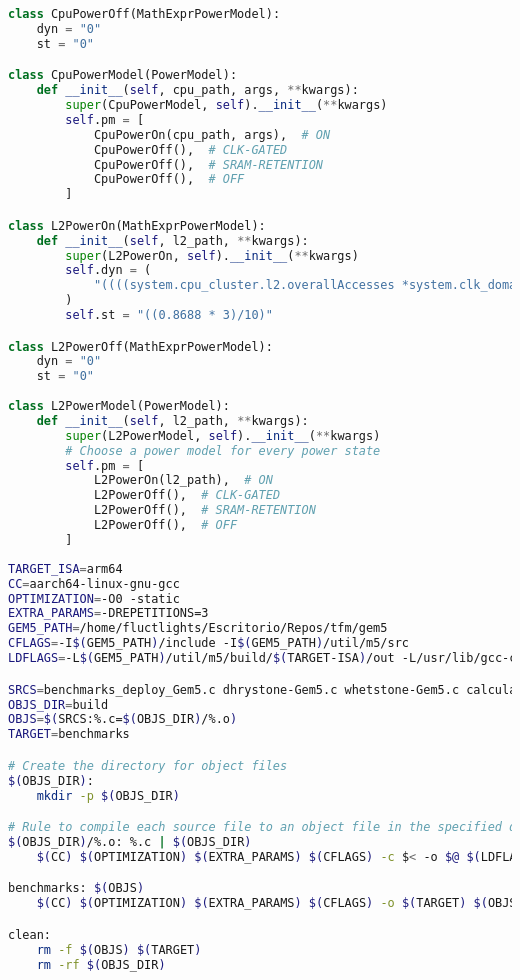 \begin{lstlisting}[language=Python,caption={Integración de modelado de energía en Gem5},label=lst:addPower,showstringspaces=false,frame=single]
class CpuPowerOff(MathExprPowerModel):
    dyn = "0"
    st = "0"

class CpuPowerModel(PowerModel):
    def __init__(self, cpu_path, args, **kwargs):
        super(CpuPowerModel, self).__init__(**kwargs)
        self.pm = [
            CpuPowerOn(cpu_path, args),  # ON
            CpuPowerOff(),  # CLK-GATED
            CpuPowerOff(),  # SRAM-RETENTION
            CpuPowerOff(),  # OFF
        ]

class L2PowerOn(MathExprPowerModel):
    def __init__(self, l2_path, **kwargs):
        super(L2PowerOn, self).__init__(**kwargs)
        self.dyn = (
            "((((system.cpu_cluster.l2.overallAccesses *system.clk_domain.clock)/(simSeconds*1e18)) * 1501.5 * (0.8688*0.8688) * 0.00000000572830963981) * 1e12)"
        )
        self.st = "((0.8688 * 3)/10)"

class L2PowerOff(MathExprPowerModel):
    dyn = "0"
    st = "0"
    
class L2PowerModel(PowerModel):
    def __init__(self, l2_path, **kwargs):
        super(L2PowerModel, self).__init__(**kwargs)
        # Choose a power model for every power state
        self.pm = [
            L2PowerOn(l2_path),  # ON
            L2PowerOff(),  # CLK-GATED
            L2PowerOff(),  # SRAM-RETENTION
            L2PowerOff(),  # OFF
        ]
\end{lstlisting}

\begin{lstlisting}[language=bash,caption={Makefile para automatizar compilaciones aarch64},label=lst:makefileCompilacionCruzada, showstringspaces=false,frame=single]
TARGET_ISA=arm64
CC=aarch64-linux-gnu-gcc
OPTIMIZATION=-O0 -static
EXTRA_PARAMS=-DREPETITIONS=3
GEM5_PATH=/home/fluctlights/Escritorio/Repos/tfm/gem5
CFLAGS=-I$(GEM5_PATH)/include -I$(GEM5_PATH)/util/m5/src
LDFLAGS=-L$(GEM5_PATH)/util/m5/build/$(TARGET-ISA)/out -L/usr/lib/gcc-cross/aarch64-linux-gnu/11 -lm5 -lm

SRCS=benchmarks_deploy_Gem5.c dhrystone-Gem5.c whetstone-Gem5.c calcular-pi-Gem5.c calcular-primos-Gem5.c
OBJS_DIR=build
OBJS=$(SRCS:%.c=$(OBJS_DIR)/%.o)
TARGET=benchmarks

# Create the directory for object files
$(OBJS_DIR):
    mkdir -p $(OBJS_DIR)

# Rule to compile each source file to an object file in the specified directory
$(OBJS_DIR)/%.o: %.c | $(OBJS_DIR)
    $(CC) $(OPTIMIZATION) $(EXTRA_PARAMS) $(CFLAGS) -c $< -o $@ $(LDFLAGS)

benchmarks: $(OBJS)
    $(CC) $(OPTIMIZATION) $(EXTRA_PARAMS) $(CFLAGS) -o $(TARGET) $(OBJS) $(LDFLAGS)

clean:
    rm -f $(OBJS) $(TARGET)
    rm -rf $(OBJS_DIR)

\end{lstlisting}

